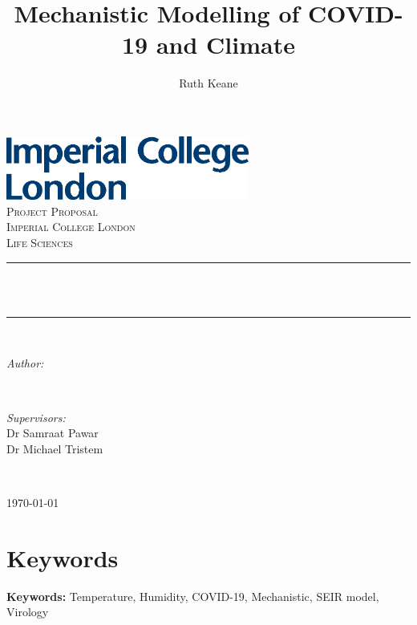 \documentclass[11pt]{article}
\newcommand{\HRule}{\rule{\linewidth}{1mm}}
\begin{document}
\title{Mechanistic Modelling of COVID-19 and Climate}%
\author{Ruth Keane}

\begin{titlepage}
\includegraphics[width=8cm]{logo.eps}\\[1cm] 
\center 
\textsc{\LARGE Project Proposal}\\[1.5cm] 
\textsc{\Large Imperial College London}\\[0.5cm]
\textsc{\large Life Sciences}\\[0.5cm] 
\makeatletter
\HRule \\[0.4cm]
{ \huge \bfseries \@title}\\[0.4cm] %
\HRule \\[1.5cm]

\begin{minipage}{0.4\textwidth}
\begin{flushleft} \large
\emph{Author:}\\
\@author %
\end{flushleft}
\end{minipage}
~
\begin{minipage}{0.4\textwidth}
\begin{flushright} \large
\emph{Supervisors:} \\
Dr Samraat Pawar \\[1.2em] %
Dr Michael Tristem\\[1.2em]
\end{flushright}
\end{minipage}\\[2cm]
\makeatother

{\large \today}\\[2cm] %
\vfill %
\clearpage
\end{titlepage}

\linenumbers
\section{Keywords} %
{\bf Keywords:} Temperature, Humidity, COVID-19, Mechanistic, SEIR model, Virology
\end{document}
